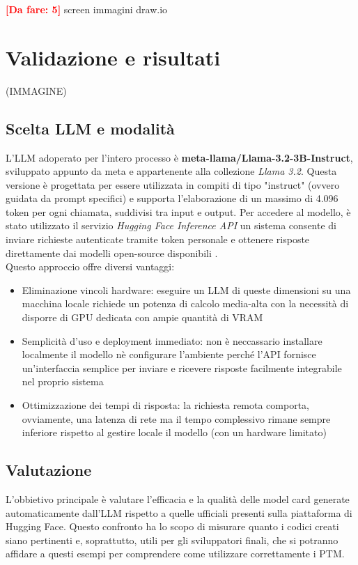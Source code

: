 \documentclass{article}
\newcommand{\dafare}[1]{\textbf{\textcolor{red}{[Da fare: #1]}}}
\begin{document}
\dafare{5}
screen immagini draw.io

\section{Validazione e risultati}
(IMMAGINE)\\
\subsection{Scelta LLM e modalità} \label{scelta LLM}
L'LLM adoperato per l'intero processo è \textbf{meta-llama/Llama-3.2-3B-Instruct}, sviluppato appunto da meta e appartenente alla collezione \textit{Llama 3.2}. Questa versione è progettata per essere utilizzata in compiti di tipo "instruct" (ovvero guidata da prompt specifici) e supporta l’elaborazione di un massimo di 4.096 token per ogni chiamata, suddivisi tra input e output.  
Per accedere al modello, è stato utilizzato il servizio \textit{Hugging Face Inference API} un sistema consente di inviare richieste autenticate tramite token personale e ottenere risposte direttamente dai modelli open-source disponibili .\\
Questo approccio offre diversi vantaggi:
\begin{itemize}
    \item Eliminazione vincoli hardware: eseguire un LLM di queste dimensioni su una macchina locale richiede un potenza di calcolo media-alta con la necessità di disporre di GPU dedicata con ampie quantità di VRAM
    \item Semplicità d'uso e deployment immediato: non è neccassario installare localmente il modello nè configurare l'ambiente perché l'API fornisce un'interfaccia semplice per inviare e ricevere risposte facilmente integrabile nel proprio sistema
    \item Ottimizzazione dei tempi di risposta: la richiesta remota comporta, ovviamente, una latenza di rete ma il tempo complessivo rimane sempre inferiore rispetto al gestire locale il modello (con un hardware limitato)
\end{itemize}
\subsection{Valutazione}
L'obbietivo principale è valutare l'efficacia e la qualità delle model card generate automaticamente dall'LLM rispetto a quelle ufficiali presenti sulla piattaforma di Hugging Face.  Questo confronto ha lo scopo di misurare quanto i codici creati siano pertinenti e, soprattutto, utili per gli sviluppatori finali, che si potranno affidare a questi esempi per comprendere come utilizzare correttamente i PTM.
\end{document}
